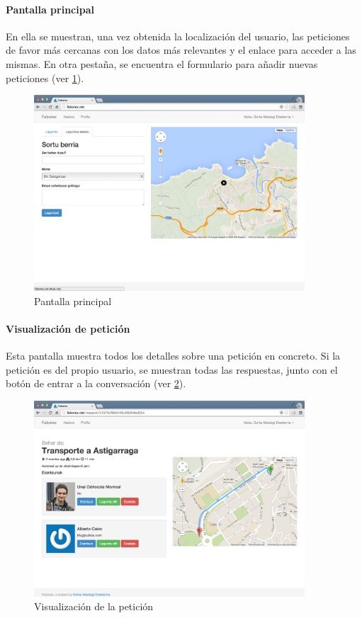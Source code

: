 \documentclass[main]{subfiles}
\begin{document}
\paragraph{Pantalla principal}
En ella se muestran, una vez obtenida la localización del usuario, las peticiones de favor más cercanas con los datos más relevantes y el enlace para acceder a las mismas. En otra pestaña, se encuentra el formulario para añadir nuevas peticiones (ver \cref{fig:webapp-newform}).

\begin{figure}
  \centering
  \includegraphics[width=0.9\textwidth]{images/webapp-newform}
  \caption{Pantalla principal}
  \label{fig:webapp-newform}
\end{figure}

\paragraph{Visualización de petición}
Esta pantalla muestra todos los detalles sobre una petición en concreto. Si la petición es del propio usuario, se muestran todas las respuestas, junto con el botón de entrar a la conversación (ver \cref{fig:webapp-request}).

\begin{figure}
  \centering
  \includegraphics[width=0.9\textwidth]{images/webapp-request}
  \caption{Visualización de la petición}
  \label{fig:webapp-request}
\end{figure}
\end{document}
